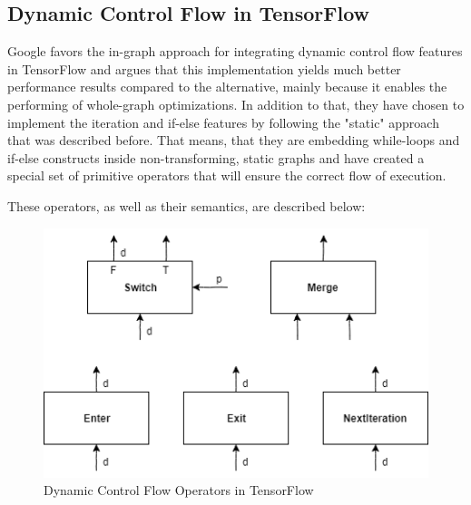 \documentclass[ack,preface]{dithesis}
\begin{document}
    \subsection{Dynamic Control Flow in TensorFlow}
Google favors the in-graph approach for integrating dynamic control flow features in TensorFlow and argues that this implementation yields much better performance results compared to the alternative, mainly because it enables the performing of whole-graph optimizations. In addition to that, they have chosen to implement the iteration and if-else features by following the "static" approach that was described before. That means, that they are embedding while-loops and if-else constructs inside non-transforming, static graphs and have created a special set of primitive operators that will ensure the correct flow of execution.  \cite{Yu:2018}

These operators, as well as their semantics, are described below:

\begin{figure}
\centering
\includegraphics[scale=0.8]{figures/TFoperators}
\caption{ Dynamic Control Flow Operators in TensorFlow}
\end{figure}
\end{document}
